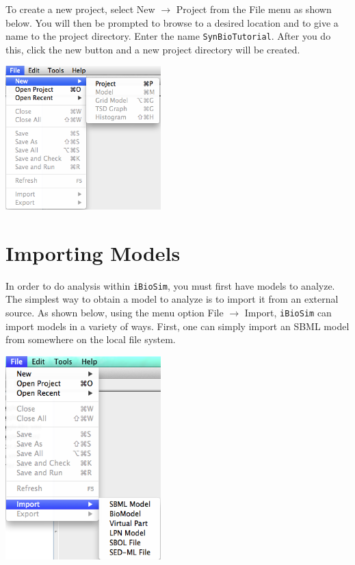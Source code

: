 \documentclass[titlepage,11pt]{article}
\begin{document}
\noindent
To create a new project, select New $\rightarrow$ Project from the File menu as shown below.  You will then be prompted to browse to a desired location and to give a name to the project directory.  Enter the name {\tt SynBioTutorial}.  After you do this, click the new button and a new project directory will be created.  

\begin{center}
\includegraphics[width=60mm]{screenshots/project}
\end{center}

\section{Importing Models}

\noindent
In order to do analysis within {\tt iBioSim}, you must first have models to analyze.  The simplest way to obtain a model to analyze is to import it from an external source.  As shown below, using the menu option File $\rightarrow$ Import, {\tt iBioSim} can import models in a variety of ways.  First, one can simply import an SBML model from somewhere on the local file system.  

\begin{center}
\includegraphics[width=60mm]{screenshots/import}
\end{center}
\end{document}
